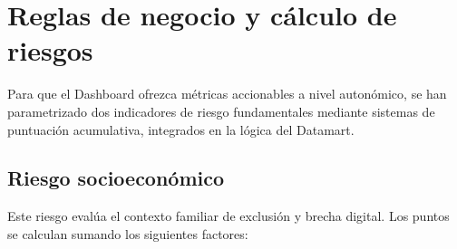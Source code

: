 \section{Reglas de negocio y cálculo de riesgos}

Para que el Dashboard ofrezca métricas accionables a nivel autonómico, se han parametrizado dos indicadores de riesgo fundamentales mediante sistemas de puntuación acumulativa, integrados en la lógica del Datamart.

\subsection{Riesgo socioeconómico}
Este riesgo evalúa el contexto familiar de exclusión y brecha digital. Los puntos se calculan sumando los siguientes factores:

